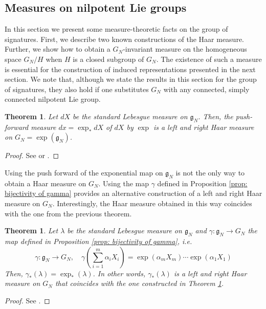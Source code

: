\documentclass[pdflatex,sn-mathphys-num]{sn-jnl}
\theoremstyle{thmstyletwo}
\theoremstyle{thmstyleone}
\newtheorem{theorem}[definition]{Theorem}
\theoremstyle{thmstyletwo}
\newcommand{\fancyg}{\mathfrak{g}}
\begin{document}
	\subsection{Measures on nilpotent Lie groups}\label{sec: measures on nilpotent lie groups}
	In this section we present some measure-theoretic facts on the group of signatures. First, we describe two known constructions of the Haar measure. Further, we show how to obtain a $G_N$-invariant measure on the homogeneous space $G_N/H$ when $H$ is a closed subgroup of $G_N$. The existence of such a measure is essential for the construction of induced representations presented in the next section. We note that, although we state the results in this section for the group of signatures, they also hold if one substitutes $G_N$ with any connected, simply connected nilpotent Lie group.
	\begin{theorem}\label{thm: construction of haar measure}
		Let $dX$ be the standard Lebesgue measure on $\fancyg_N$. Then, the push-forward measure $dx = \exp_{*}dX$ of $dX$ by $\exp$ is a left and right Haar measure on $G_N=\exp(\mathfrak g_N)$.
	\end{theorem}
	\begin{proof}
		See \cite[Proposition~16.40]{friz2010multidimensional} or \cite[Theorem~1.2.10]{corwin1990representations}.
	\end{proof}
	Using the push forward of the exponential map on $\fancyg_N$ is not the only way to obtain a Haar measure on $G_N$.  Using the map $\gamma$ defined in Proposition \ref{prop: bijectivity of gamma} provides an alternative construction of a left and right Haar measure on $G_N$. Interestingly, the Haar measure obtained in this way coincides with the one from the previous theorem.
	\begin{theorem}\label{thm: alternative haar measure}
        Let $\lambda$ be the standard Lebesgue measure on $\fancyg_N$ and $\gamma: \fancyg_N \to G_N$ the map defined in Proposition \ref{prop: bijectivity of gamma}, i.e.
        $$\gamma: \fancyg_N \to G_N,\quad \gamma\left(\sum_{i=1}^m\alpha_iX_i\right) = \exp(\alpha_mX_m)\cdots\exp(\alpha_1X_1)$$
        Then, $\gamma_{*}(\lambda) =  \exp_{*}(\lambda)$. In other words, $\gamma_{*}(\lambda)$ is a left and right Haar measure on $G_N$ that coincides with the one constructed in Theorem \ref{thm: construction of haar measure}.
    \end{theorem}
	\begin{proof}
		See \cite[Theorem~1.2.10 and Corollary 1.2.11]{corwin1990representations}.
	\end{proof}
\end{document}
